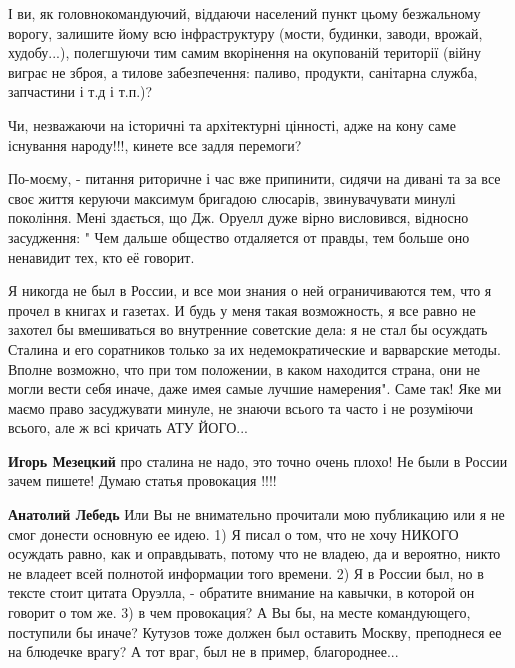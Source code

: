 \begin{itemize}
\begin{itemize}
\begin{itemize}
І ви, як головнокомандуючий, віддаючи населений
пункт цьому безжальному ворогу, залишите йому всю інфраструктуру (мости,
будинки, заводи, врожай, худобу...), полегшуючи тим самим вкорінення на
окупованій території (війну виграє не зброя, а тилове забезпечення: паливо,
продукти, санітарна служба, запчастини і т.д і т.п.)? 

Чи, незважаючи на історичні та архітектурні цінності, адже на кону саме
існування народу!!!, кинете все задля перемоги? 

По-моєму, - питання риторичне і час вже припинити, сидячи на дивані та за все
своє життя керуючи максимум бригадою слюсарів, звинувачувати минулі покоління.
Мені здається, що Дж. Оруелл дуже вірно висловився, відносно засудження: " Чем
дальше общество отдаляется от правды, тем больше оно ненавидит тех, кто её
говорит.

Я никогда не был в России, и все мои знания о ней ограничиваются тем, что я
прочел в книгах и газетах. И будь у меня такая возможность, я все равно не
захотел бы вмешиваться во внутренние советские дела: я не стал бы осуждать
Сталина и его соратников только за их недемократические и варварские методы.
Вполне возможно, что при том положении, в каком находится страна, они не могли
вести себя иначе, даже имея самые лучшие намерения". Саме так! Яке ми маємо
право засуджувати минуле, не знаючи всього та часто і не розуміючи всього, але
ж всі кричать АТУ ЙОГО...

 
\textbf{Игорь Мезецкий} про сталина не надо, это точно очень плохо! Не были в России зачем пишете!
Думаю статья провокация !!!!


 
\textbf{Анатолий Лебедь} Или Вы не внимательно прочитали мою публикацию или я
не смог донести основную ее идею. 1) Я писал о том, что не хочу НИКОГО осуждать
равно, как и оправдывать, потому что не владею, да и вероятно, никто не владеет
всей полнотой информации того времени. 2) Я в России был, но в тексте стоит
цитата Оруэлла, - обратите внимание на кавычки, в которой он говорит о том же.
3) в чем провокация? А Вы бы, на месте командующего, поступили бы иначе?
Кутузов тоже должен был оставить Москву, преподнеся ее на блюдечке врагу? А тот
враг, был не в пример, благороднее...


\end{itemize}
\end{itemize}
\end{itemize}
